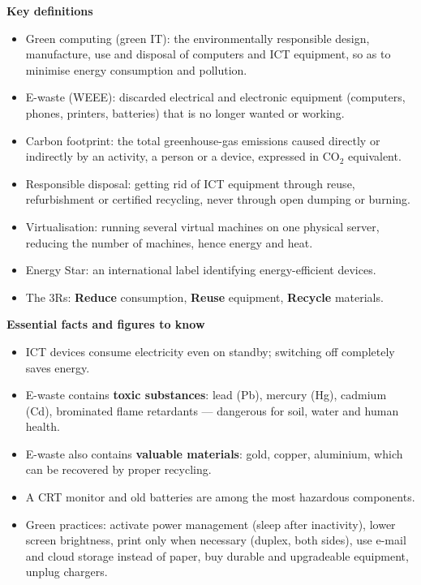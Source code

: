 \documentclass[11pt]{article}
\newcommand{\cle}[1]{{\popxbold\color{popdark}#1}}
\begin{document}
\begin{bilan}
\textbf{Key definitions}
\begin{itemize}
\item \cle{Green computing} (green IT): the environmentally responsible design, manufacture, use and disposal of computers and ICT equipment, so as to minimise energy consumption and pollution.
\item \cle{E-waste} (WEEE): discarded electrical and electronic equipment (computers, phones, printers, batteries) that is no longer wanted or working.
\item \cle{Carbon footprint}: the total greenhouse-gas emissions caused directly or indirectly by an activity, a person or a device, expressed in CO$_2$ equivalent.
\item \cle{Responsible disposal}: getting rid of ICT equipment through reuse, refurbishment or certified recycling, never through open dumping or burning.
\item \cle{Virtualisation}: running several virtual machines on one physical server, reducing the number of machines, hence energy and heat.
\item \cle{Energy Star}: an international label identifying energy-efficient devices.
\item The \cle{3Rs}: \textbf{Reduce} consumption, \textbf{Reuse} equipment, \textbf{Recycle} materials.
\end{itemize}

\textbf{Essential facts and figures to know}
\begin{itemize}
\item ICT devices consume electricity even on \cle{standby}; switching off completely saves energy.
\item E-waste contains \textbf{toxic substances}: lead (Pb), mercury (Hg), cadmium (Cd), brominated flame retardants --- dangerous for soil, water and human health.
\item E-waste also contains \textbf{valuable materials}: gold, copper, aluminium, which can be recovered by proper recycling.
\item A CRT monitor and old batteries are among the most hazardous components.
\item Green practices: activate \cle{power management} (sleep after inactivity), lower screen brightness, print only when necessary (duplex, both sides), use e-mail and cloud storage instead of paper, buy durable and upgradeable equipment, unplug chargers.
\end{itemize}


\end{bilan}
\end{document}
